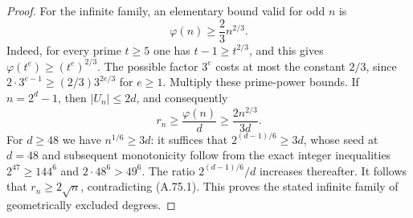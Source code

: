\documentclass[11pt]{article}
\begin{document}
\begin{proof}
For the infinite family, an elementary bound valid for
odd $n$ is
\[
                       \varphi(n)\ge\frac23 n^{2/3}.
\]
Indeed, for every prime $t\ge5$ one has
$t-1\ge t^{2/3}$, and this gives
$\varphi(t^e)\ge(t^e)^{2/3}$. The possible factor
$3^e$ costs at most the constant $2/3$, since
$2\cdot3^{e-1}\ge(2/3)3^{2e/3}$ for $e\ge1$.
Multiply these prime-power bounds.
If $n=2^d-1$, then $|U_n|\le2d$, and consequently
\[
 r_n\ge\frac{\varphi(n)}d
      \ge\frac{2n^{2/3}}{3d}.
\]
For $d\ge48$ we have $n^{1/6}\ge3d$: it suffices
that $2^{(d-1)/6}\ge3d$, whose seed at $d=48$
and subsequent monotonicity follow from the exact integer
inequalities $2^{47}\ge144^6$ and
$2\cdot48^6>49^6$. The ratio
$2^{(d-1)/6}/d$ increases thereafter.
It follows that $r_n\ge2\sqrt n$, contradicting
(A.75.1). This proves the stated infinite family of
geometrically excluded degrees.
\end{proof}
\end{document}
